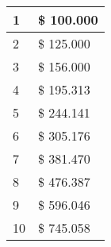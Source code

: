 
\begin{center}
    \begin{tabular}{|l|l|}
      \hline
      1  & \$ 100.000 \\ \hline
      2  & \$ 125.000 \\ \hline
      3  & \$ 156.000 \\ \hline
      4  & \$ 195.313 \\ \hline
      5  & \$ 244.141 \\ \hline
      6  & \$ 305.176 \\ \hline
      7  & \$ 381.470 \\ \hline
      8  & \$ 476.387 \\ \hline
      9  & \$ 596.046 \\ \hline
      10 & \$ 745.058 \\ \hline
    \end{tabular}
\end{center}